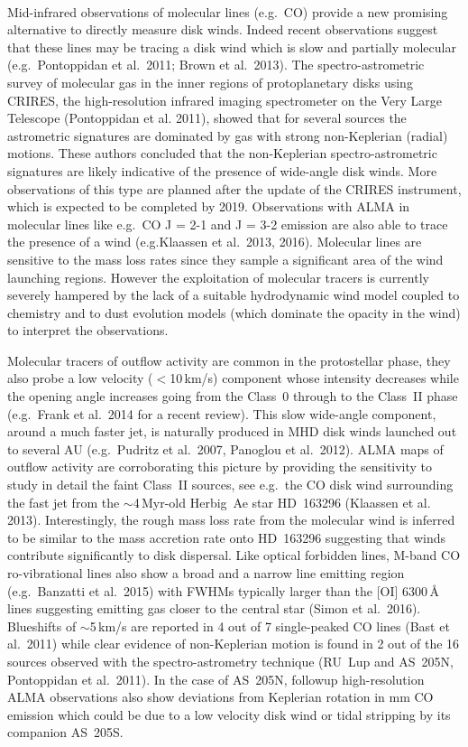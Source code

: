 \documentclass[10pt,fleqn,twoside]{article}
\begin{document}
\vspace{0.5em}{\Tcol\bf Molecular species}\\
Mid-infrared observations of molecular lines (e.g.\ CO) provide a new
promising alternative to directly measure disk winds. Indeed recent
observations suggest that these lines may be tracing a disk wind which
is slow and partially molecular (e.g.\ Pontoppidan et al.\ 2011; Brown et al.\ 2013). 
The spectro-astrometric survey of molecular gas in the inner regions of
protoplanetary disks using CRIRES, the high-resolution infrared
imaging spectrometer on the Very Large Telescope (Pontoppidan et
al. 2011), showed that for several sources the astrometric signatures
are dominated by gas with strong non-Keplerian (radial) motions. These
authors concluded that the non-Keplerian spectro-astrometric
signatures are likely indicative of the presence of wide-angle disk
winds. 
More observations of this type are planned after the update of
the CRIRES instrument, which is expected to be completed by
2019. Observations with ALMA in molecular lines like e.g.\ CO J = 2-1
and J = 3-2 emission are also able to trace the presence of a wind (e.g.Klaassen et al.\ 2013, 2016).  
Molecular lines are sensitive to the mass loss rates since they
sample a significant area of the wind launching regions. However the
exploitation of molecular tracers is currently severely hampered by
the lack of a suitable hydrodynamic wind model coupled to chemistry
and to dust evolution models (which dominate the opacity in the wind)
to interpret the observations.

Molecular tracers of outflow activity are common in the protostellar
phase, they also probe a low velocity ($<$10\,km/s) component whose
intensity decreases while the opening angle increases going from the
Class~0 through to the Class~II phase (e.g.\ Frank et al.\ 2014 for a
recent review). This slow wide-angle component, around a much faster
jet, is naturally produced in MHD disk winds launched out to several
AU (e.g.\ Pudritz et al.\ 2007, Panoglou et al.\ 2012). ALMA maps of
outflow activity are corroborating this picture by providing the
sensitivity to study in detail the faint Class~II sources, see
e.g.\ the CO disk wind surrounding the fast jet from the
$\sim$4\,Myr-old Herbig~Ae star HD~163296 (Klaassen et
al. 2013). Interestingly, the rough mass loss rate from the molecular
wind is inferred to be similar to the mass accretion rate onto
HD~163296 suggesting that winds contribute significantly to disk
dispersal. Like optical forbidden lines, M-band CO ro-vibrational
lines also show a broad and a narrow line emitting region
(e.g.\ Banzatti et al.\ 2015) with FWHMs typically larger than the [OI]
6300\,\AA{} lines suggesting emitting gas closer to the central star
(Simon et al.\ 2016). Blueshifts of $\sim$5\,km/s are reported in 4 out
of  7 single-peaked CO lines (Bast et al.\ 2011) while clear evidence
of non-Keplerian motion is found in 2 out of the 16 sources observed
with the spectro-astrometry technique (RU~Lup and AS~205N, Pontoppidan
et al.\ 2011). In the case of AS~205N, followup high-resolution ALMA
observations also show deviations from Keplerian rotation in mm CO
emission which could be due to a low velocity disk wind or tidal
stripping by its companion AS~205S. 
\end{document}
